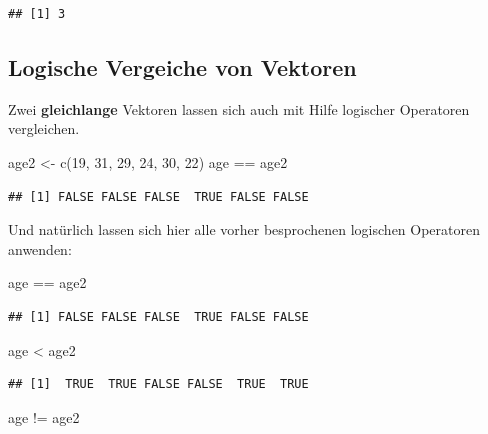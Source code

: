\documentclass[
]{book}
\newenvironment{Shaded}{\begin{snugshade}}{\end{snugshade}}
\newcommand{\DecValTok}[1]{\textcolor[rgb]{0.00,0.00,0.81}{#1}}
\newcommand{\FunctionTok}[1]{\textcolor[rgb]{0.00,0.00,0.00}{#1}}
\newcommand{\NormalTok}[1]{#1}
\newcommand{\OtherTok}[1]{\textcolor[rgb]{0.56,0.35,0.01}{#1}}
\newcommand{\SpecialCharTok}[1]{\textcolor[rgb]{0.00,0.00,0.00}{#1}}
\begin{document}
\begin{verbatim}
## [1] 3
\end{verbatim}

\hypertarget{logische-vergeiche-von-vektoren}{%
\subsection{Logische Vergeiche von Vektoren}\label{logische-vergeiche-von-vektoren}}

Zwei \textbf{gleichlange} Vektoren lassen sich auch mit Hilfe logischer Operatoren vergleichen.

\begin{Shaded}
\begin{Highlighting}[]
\NormalTok{age2 }\OtherTok{\textless{}{-}} \FunctionTok{c}\NormalTok{(}\DecValTok{19}\NormalTok{, }\DecValTok{31}\NormalTok{, }\DecValTok{29}\NormalTok{, }\DecValTok{24}\NormalTok{, }\DecValTok{30}\NormalTok{, }\DecValTok{22}\NormalTok{)}
\NormalTok{age }\SpecialCharTok{==}\NormalTok{ age2}
\end{Highlighting}
\end{Shaded}

\begin{verbatim}
## [1] FALSE FALSE FALSE  TRUE FALSE FALSE
\end{verbatim}

Und natürlich lassen sich hier alle vorher besprochenen logischen Operatoren anwenden:

\begin{Shaded}
\begin{Highlighting}[]
\NormalTok{age }\SpecialCharTok{==}\NormalTok{ age2 }
\end{Highlighting}
\end{Shaded}

\begin{verbatim}
## [1] FALSE FALSE FALSE  TRUE FALSE FALSE
\end{verbatim}

\begin{Shaded}
\begin{Highlighting}[]
\NormalTok{age }\SpecialCharTok{\textless{}}\NormalTok{ age2 }
\end{Highlighting}
\end{Shaded}

\begin{verbatim}
## [1]  TRUE  TRUE FALSE FALSE  TRUE  TRUE
\end{verbatim}

\begin{Shaded}
\begin{Highlighting}[]
\NormalTok{age }\SpecialCharTok{!=}\NormalTok{ age2}
\end{Highlighting}
\end{Shaded}
\end{document}
